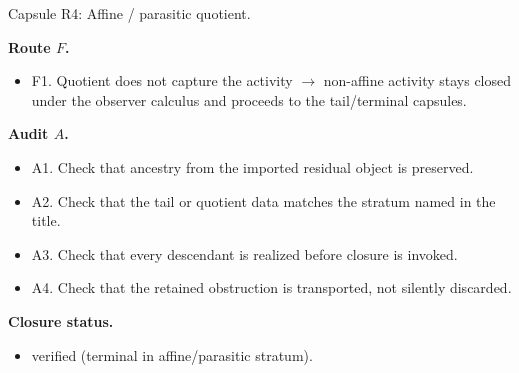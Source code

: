 \documentclass[11pt]{amsart}
\newcommand{\capsulefield}[1]{\par\smallskip\noindent\textbf{#1.}\ }
\begin{document}
\begin{proofcapsule}{Capsule R4: Affine / parasitic quotient.}
  \capsulefield{Route \(F\)}
  \begin{itemize}[leftmargin=1.8em]
  \item F1. Quotient does not capture the activity $\to$ non-affine activity stays closed under the observer calculus and proceeds to the tail/terminal capsules.
  \end{itemize}

  \capsulefield{Audit \(A\)}
  \begin{itemize}[leftmargin=1.8em]
  \item A1. Check that ancestry from the imported residual object is preserved.
  \item A2. Check that the tail or quotient data matches the stratum named in the title.
  \item A3. Check that every descendant is realized before closure is invoked.
  \item A4. Check that the retained obstruction is transported, not silently discarded.
  \end{itemize}
  \capsulefield{Closure status}
  \begin{itemize}[leftmargin=1.8em]
  \item verified (terminal in affine/parasitic stratum).
  \end{itemize}
\end{proofcapsule}
\end{document}
